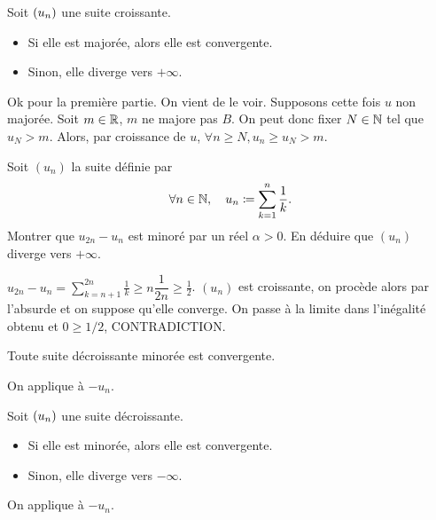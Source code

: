 \documentclass{magnolia}
\begin{document}
\begin{proposition}[utile=-3]
Soit $\left(u_n\right)$ une suite croissante.
\begin{itemize}
\item Si elle est majorée, alors elle est convergente.
\item Sinon, elle diverge vers $+\infty$.
\end{itemize}
\end{proposition}

\begin{preuve}
Ok pour la première partie. On vient de le voir.
Supposons cette fois $u$ non majorée. Soit $m\in\mathbb{R}$, $m$ ne majore pas $B$. On peut donc fixer $N\in\mathbb{N}$ tel que $u_N>m$. Alors, par croissance de $u$, $\forall n\geq N, u_n\geq u_N>m$.
\end{preuve}


\begin{exoUnique}
\exo Soit $(u_n)$ la suite définie par
  \[\forall n\in\mathbb{N} ,\quad u_n\coloneqq\sum_{k=1}^n \frac{1}{k}.\]
  Montrer que $u_{2n}-u_n$ est minoré par un réel $\alpha>0$. En déduire que
  $(u_n)$ diverge vers $+\infty$.
\end{exoUnique}

\begin{sol}
$u_{2n}-u_n=\displaystyle \sum_{k=n+1}^{2n} \frac{1}{k}\geq n\dfrac{1}{2n}\geq \frac{1}{2}$.
$(u_n)$ est croissante, on procède alors par l'absurde et on suppose qu'elle converge. On passe à la limite dans l'inégalité obtenu et $0\geq 1/2$, CONTRADICTION.
\end{sol}

\begin{proposition}[utile=-3]
Toute suite décroissante minorée est convergente.
\end{proposition}

\begin{preuve}
On applique à $-u_n$.
\end{preuve}


\begin{proposition}[utile=-3]
Soit $\left(u_n\right)$ une suite décroissante.
\begin{itemize}
\item Si elle est minorée, alors elle est convergente.
\item Sinon, elle diverge vers $-\infty$.
\end{itemize}
\end{proposition}

\begin{preuve}
On applique à $-u_n$.
\end{preuve}
\end{document}
